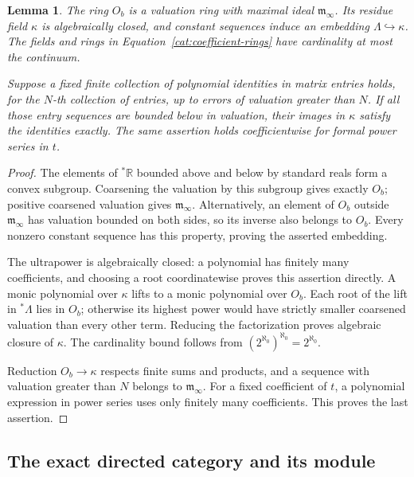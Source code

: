 \documentclass[11pt]{article}
\newtheorem{lemma}[theorem]{Lemma}
\theoremstyle{definition}
\theoremstyle{remark}
\numberwithin{equation}{section}
\begin{document}
\begin{lemma}\label{cat:residue}
The ring \(O_b\) is a valuation ring with maximal ideal
\(\mathfrak m_\infty\).  Its residue field \(\kappa\) is algebraically
closed, and constant sequences induce an embedding
\(\Lambda\hookrightarrow\kappa\).  The fields and rings in
Equation~\eqref{cat:coefficient-rings} have cardinality at most the
continuum.

Suppose a fixed finite collection of polynomial identities in matrix
entries holds, for the \(N\)-th collection of entries, up to errors of
valuation greater than \(N\).  If all those entry sequences are bounded
below in valuation, their images in \(\kappa\) satisfy the identities
exactly.  The same assertion holds coefficientwise for formal power
series in \(t\).
\end{lemma}

\begin{proof}
The elements of \({}^*\mathbb R\) bounded above and below by standard reals form
a convex subgroup.  Coarsening the valuation by this subgroup gives
exactly \(O_b\); positive coarsened valuation gives
\(\mathfrak m_\infty\).  Alternatively, an element of \(O_b\) outside
\(\mathfrak m_\infty\) has valuation bounded on both sides, so its inverse
also belongs to \(O_b\).  Every nonzero constant sequence has this
property, proving the asserted embedding.

The ultrapower is algebraically closed: a polynomial has finitely many
coefficients, and choosing a root coordinatewise proves this assertion
directly.  A monic polynomial over \(\kappa\) lifts to a monic polynomial
over \(O_b\).  Each root of the lift in \({}^*\Lambda\) lies in \(O_b\);
otherwise its highest power would have strictly smaller coarsened
valuation than every other term.  Reducing the factorization proves
algebraic closure of \(\kappa\).  The cardinality bound follows from
\((2^{\aleph_0})^{\aleph_0}=2^{\aleph_0}\).

Reduction \(O_b\to\kappa\) respects finite sums and products, and a sequence
with valuation greater than \(N\) belongs to \(\mathfrak m_\infty\).
For a fixed coefficient of \(t\), a polynomial expression in power
series uses only finitely many coefficients.  This proves the last
assertion.
\end{proof}

\subsection{The exact directed category and its module}
\end{document}
